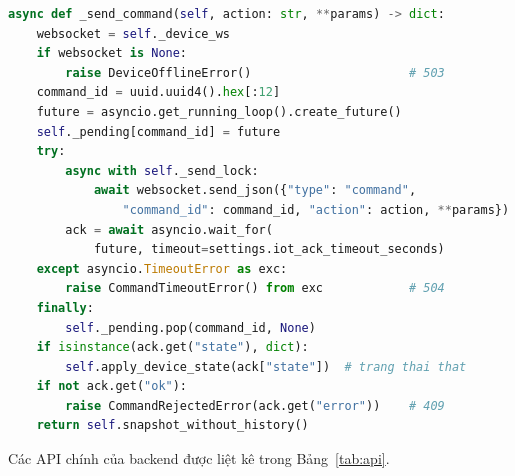 \documentclass[12pt,a4paper]{extarticle}
\begin{document}
\begin{lstlisting}[language=Python]
async def _send_command(self, action: str, **params) -> dict:
    websocket = self._device_ws
    if websocket is None:
        raise DeviceOfflineError()                      # 503
    command_id = uuid.uuid4().hex[:12]
    future = asyncio.get_running_loop().create_future()
    self._pending[command_id] = future
    try:
        async with self._send_lock:
            await websocket.send_json({"type": "command",
                "command_id": command_id, "action": action, **params})
        ack = await asyncio.wait_for(
            future, timeout=settings.iot_ack_timeout_seconds)
    except asyncio.TimeoutError as exc:
        raise CommandTimeoutError() from exc            # 504
    finally:
        self._pending.pop(command_id, None)
    if isinstance(ack.get("state"), dict):
        self.apply_device_state(ack["state"])  # trang thai that
    if not ack.get("ok"):
        raise CommandRejectedError(ack.get("error"))    # 409
    return self.snapshot_without_history()
\end{lstlisting}

Các API chính của backend được liệt kê trong Bảng~\ref{tab:api}.
\end{document}

